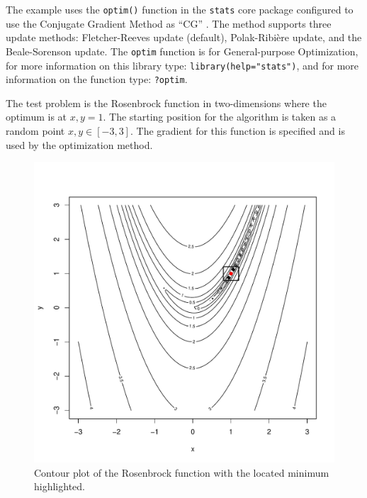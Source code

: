 The example uses the \texttt{optim()} function in the \texttt{stats} core package configured to use the Conjugate Gradient Method as ``CG'' \cite{RDCT2011a}. The method supports three update methods: Fletcher-Reeves update (default), Polak-Ribi\`ere update, and the Beale-Sorenson update. The \texttt{optim} function is for General-purpose Optimization, for more information on this library type: \texttt{library(help="stats")}, and for more information on the function type: \texttt{?optim}.

The test problem is the Rosenbrock function in two-dimensions where the optimum is at $x,y=1$. The starting position for the algorithm is taken as a random point $x,y \in [-3,3]$. The gradient for this function is specified and is used by the optimization method.



\begin{figure}[htp]
\centering
\includegraphics[scale=0.45]{a_optimization/conjugate_gradient_result.pdf}
\caption{Contour plot of the Rosenbrock function with the located minimum highlighted.}
\label{plot:conjugate_gradient_result}
\end{figure}

